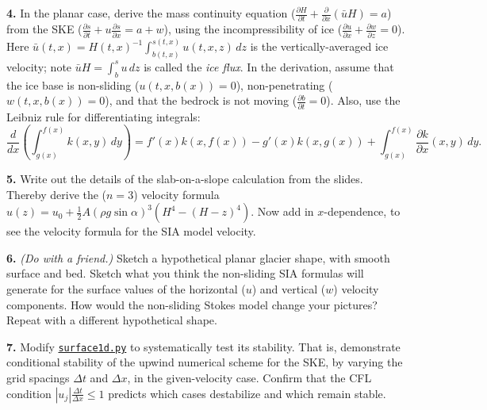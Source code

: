 \documentclass[12pt]{amsart}
\newcommand{\prob}[1]{\bigskip\noindent\textbf{#1.}\quad }
\begin{document}
\prob{4}  In the planar case, derive the mass continuity equation ($\frac{\partial H}{\partial t} + \frac{\partial}{\partial x}(\bar u H) = a$) from the SKE ($\frac{\partial s}{\partial t} + u \frac{\partial s}{\partial x} = a + w$), using the incompressibility of ice ($\frac{\partial u}{\partial x} + \frac{\partial w}{\partial z} = 0$).  Here $\bar u(t,x) = H(t,x)^{-1} \int_{b(t,x)}^{s(t,x)} u(t,x,z)\,dz$ is the vertically-averaged ice velocity; note $\bar u H = \int_b^s u\,dz$ is called the \emph{ice flux}.  In the derivation, assume that the ice base is non-sliding ($u(t,x,b(x))=0$), non-penetrating ($w(t,x,b(x))=0$), and that the bedrock is not moving ($\frac{\partial b}{\partial t} = 0$).  Also, use the Leibniz rule for differentiating integrals:
  $$\frac{d}{dx}\left(\int_{g(x)}^{f(x)} k(x,y)\,dy\right) = f'(x) k(x,f(x)) - g'(x) k(x,g(x)) + \int_{g(x)}^{f(x)} \frac{\partial k}{\partial x}(x,y)\,dy.$$

\prob{5}  Write out the details of the slab-on-a-slope calculation from the slides.  Thereby derive the ($n=3$) velocity formula $u(z) = u_0 + \frac{1}{2} A (\rho g \sin\alpha)^3  \left(H^4 - (H-z)^4\right)$.  Now add in $x$-dependence, to see the velocity formula for the SIA model velocity.

\prob{6}  \emph{(Do with a friend.)}  Sketch a hypothetical planar glacier shape, with smooth surface and bed.  Sketch what you think the non-sliding SIA formulas will generate for the surface values of the horizontal ($u$) and vertical ($w$) velocity components.  How would the non-sliding Stokes model change your pictures?  Repeat with a different hypothetical shape.

\prob{7}  Modify \href{https://github.com/bueler/mccarthy/blob/master/py/surface1d.py}{\texttt{surface1d.py}} to systematically test its stability.  That is, demonstrate conditional stability of the upwind numerical scheme for the SKE, by varying the grid spacings $\Delta t$ and $\Delta x$, in the given-velocity case.  Confirm that the CFL condition $|u_j| \frac{\Delta t}{\Delta x} \le 1$ predicts which cases destabilize and which remain stable.
\end{document}
